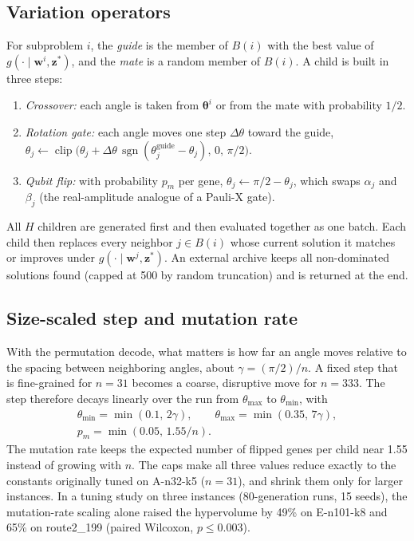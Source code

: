 \subsection{Variation operators}
For subproblem $i$, the \emph{guide} is the member of $B(i)$ with the best value
of $g(\cdot\mid\mathbf w^i,\mathbf z^\ast)$, and the \emph{mate} is a random member
of $B(i)$. A child is built in three steps:
\begin{enumerate}
\item \emph{Crossover:} each angle is taken from $\boldsymbol\theta^i$ or from the
  mate with probability $1/2$.
\item \emph{Rotation gate:} each angle moves one step $\Delta\theta$ toward the
  guide, $\theta_j\leftarrow\operatorname{clip}\bigl(\theta_j+\Delta\theta\,
  \operatorname{sgn}(\theta^{\mathrm{guide}}_j-\theta_j),\,0,\,\pi/2\bigr)$.
\item \emph{Qubit flip:} with probability $p_m$ per gene,
  $\theta_j\leftarrow\pi/2-\theta_j$, which swaps $\alpha_j$ and $\beta_j$ (the
  real-amplitude analogue of a Pauli-X gate).
\end{enumerate}
All $H$ children are generated first and then evaluated together as one batch.
Each child then replaces every neighbor $j\in B(i)$ whose current solution it
matches or improves under $g(\cdot\mid\mathbf w^j,\mathbf z^\ast)$. An external
archive keeps all non-dominated solutions found (capped at 500 by random
truncation) and is returned at the end.

\subsection{Size-scaled step and mutation rate}
With the permutation decode, what matters is how far an angle moves relative to
the spacing between neighboring angles, about $\gamma=(\pi/2)/n$. A fixed step
that is fine-grained for $n=31$ becomes a coarse, disruptive move for $n=333$.
The step therefore decays linearly over the run from $\theta_{\max}$ to
$\theta_{\min}$, with
\begin{equation}
\begin{gathered}
\theta_{\min}=\min(0.1,\,2\gamma),\qquad
\theta_{\max}=\min(0.35,\,7\gamma),\\
p_m=\min(0.05,\,1.55/n).
\end{gathered}
\end{equation}
The mutation rate keeps the expected number of flipped genes per child near 1.55
instead of growing with $n$. The caps make all three values reduce exactly to
the constants originally tuned on A-n32-k5 ($n=31$), and shrink them only for
larger instances. In a tuning study on three instances (80-generation runs, 15
seeds), the mutation-rate scaling alone raised the hypervolume by 49\% on
E-n101-k8 and 65\% on route2\_199 (paired Wilcoxon, $p\le0.003$).

